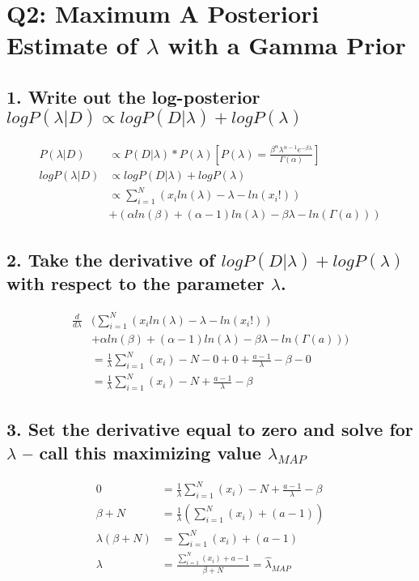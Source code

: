 \documentclass{article}
\begin{document}
    \section*{Q2: Maximum A Posteriori Estimate of $\lambda$ with a Gamma Prior}

            \subsection*{1. Write out the log-posterior $logP (\lambda|D) \propto logP (D|\lambda) + logP (\lambda)$}

                \begin{align*}
                    P(\lambda|D) &\propto P(D|\lambda)*P(\lambda) \left[P(\lambda) = \frac{\beta^\alpha\lambda^{\alpha-1}e^{-\beta\lambda}}{\Gamma(\alpha)}\right]\\
                    logP(\lambda|D) &\propto logP(D|\lambda) + logP(\lambda)\\
                    &\propto \sum_{i=1}^{N}\left( x_iln(\lambda) - \lambda - ln(x_i!)\right)\\& + (\alpha ln(\beta) + (\alpha-1)ln(\lambda) - \beta\lambda-ln(\Gamma(a)))
                \end{align*}
            \subsection*{2. Take the derivative of $logP (D|\lambda) + logP (\lambda)$ with respect to the parameter $\lambda$.}
                \begin{align*}
                    \frac{d}{d\lambda} & ( \sum_{i=1}^{N} (x_iln(\lambda) - \lambda - ln(x_i!))\\& + \alpha ln(\beta) + (\alpha-1)ln(\lambda) - \beta\lambda-ln(\Gamma(a)))\\
                    & = \frac{1}{\lambda}\sum_{i=1}^N (x_i) - N - 0 + 0 +\frac{a-1}{\lambda} - \beta - 0  \\
                    & = \frac{1}{\lambda}\sum_{i=1}^N (x_i) - N + \frac{a-1}{\lambda} - \beta
                \end{align*}

            \subsection*{3. Set the derivative equal to zero and solve for $\lambda$ – call this maximizing value $\hat{\lambda}_{MAP}$}
                \begin{align*}
                    0 &= \frac{1}{\lambda}\sum_{i=1}^N (x_i) - N + \frac{a-1}{\lambda} - \beta\\
                    \beta + N &= \frac{1}{\lambda}\left(\sum_{i=1}^N (x_i) + (a-1)\right)\\
                    \lambda(\beta + N) &=\sum_{i=1}^N (x_i) + (a-1)\\
                    \lambda &=\frac{\sum_{i=1}^N (x_i) + a-1}{\beta+N} = \hat{\lambda}_{MAP}
                \end{align*}
\end{document}
